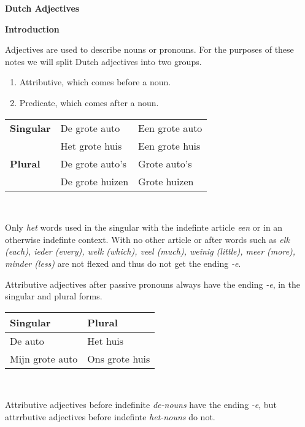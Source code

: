 \documentclass[letterpaper,11pt]{article}
\begin{document}
\begin{flushleft}
    \LARGE{\textbf{Dutch Adjectives}}
\end{flushleft}
\textbf{Introduction}
\par{Adjectives are used to describe nouns or pronouns. For the purposes of
these notes we will split Dutch adjectives into two groups.}
\begin{enumerate}%
    \item Attributive, which comes before a noun.
    \item Predicate, which comes after a noun.
\end{enumerate}
\begin{tabular}[t]{l l l}
    \textbf{Singular} & De grote auto   & Een grote auto \\
                      & Het grote huis  & Een grote huis \\
    \textbf{Plural}   & De grote auto's & Grote auto's \\
                      & De grote huizen & Grote huizen \\
\end{tabular}
\\
\par{Only \textit{het} words used in the singular with the indefinte
article \textit{een} or in an otherwise indefinte context. With no other article
or after words such as \textit{elk (each), ieder (every), welk (which), veel
(much), weinig (little), meer (more), minder (less)} are not flexed and thus do
not get the ending \textit{-e}.}
\par{Attributive adjectives after passive pronouns always have the ending
\textit{-e}, in the singular and plural forms.}
\\
\begin{tabular}[t]{l l}
    \textbf{Singular} & \textbf{Plural} \\
    \hline
    De auto           & Het huis        \\
    Mijn grote auto   & Ons grote huis  \\
    \hline
\end{tabular}
\\
\par{Attributive adjectives before indefinite \textit{de-nouns} have the ending
\textit{-e}, but attrrbutive adjectives before indefinte \textit{het-nouns} do
not.}
\\
\end{document}

